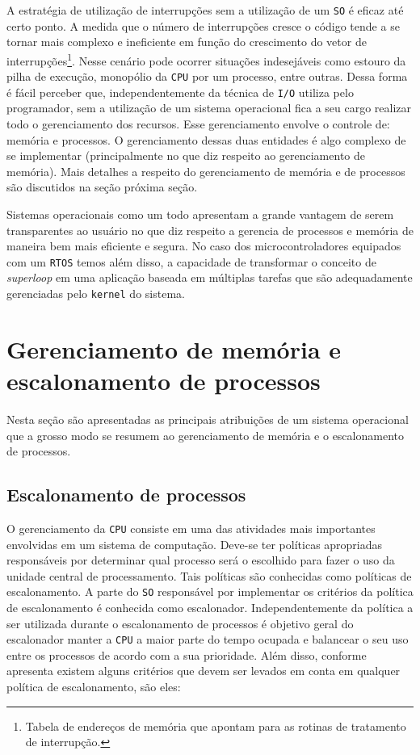A estratégia de utilização de interrupções sem a utilização de um \texttt{SO} é eficaz até certo ponto. A medida que o número de interrupções cresce o código tende a se tornar mais complexo e ineficiente em função do crescimento do vetor de interrupções\footnote{Tabela de endereços de memória que apontam para as rotinas de tratamento de interrupção.}. Nesse cenário pode ocorrer situações indesejáveis como estouro da pilha de execução, monopólio da \texttt{CPU} por um processo, entre outras.  Dessa forma é fácil perceber que, independentemente da técnica de \texttt{I/O} utiliza pelo programador, sem a utilização de um sistema operacional fica a seu cargo realizar todo o gerenciamento dos recursos. Esse gerenciamento envolve o controle de: memória e processos. O gerenciamento dessas duas entidades é algo complexo de se implementar (principalmente no que diz respeito ao gerenciamento de memória). Mais detalhes a respeito do gerenciamento de memória e de processos são discutidos na seção próxima seção.

Sistemas operacionais como um todo apresentam a grande vantagem de serem transparentes ao usuário no que diz respeito a gerencia de processos e memória de maneira bem mais eficiente e segura. No caso dos microcontroladores equipados com um \texttt{RTOS} temos além disso, a capacidade de transformar o conceito de \textit{superloop} em uma aplicação baseada em múltiplas tarefas que são adequadamente gerenciadas pelo \texttt{kernel} do sistema. 

\section{Gerenciamento de memória e escalonamento de processos} 

Nesta seção são apresentadas as principais atribuições de um sistema operacional que a grosso modo se resumem ao gerenciamento de memória e o escalonamento de processos.

\subsection{Escalonamento de processos} 

O gerenciamento da \texttt{CPU} consiste em uma das atividades mais importantes envolvidas em um sistema de computação. Deve-se ter políticas apropriadas responsáveis por determinar qual processo será o escolhido para fazer o uso da unidade central de processamento. Tais políticas são conhecidas como políticas de escalonamento. A parte do \texttt{SO} responsável por implementar os critérios da política de escalonamento é conhecida como escalonador. Independentemente da política a ser utilizada durante o escalonamento de processos é objetivo geral do escalonador manter a \texttt{CPU} a maior parte do tempo ocupada e balancear o seu uso entre os processos de acordo com a sua prioridade. Além disso, conforme apresenta \cite{machadomaia} existem alguns critérios que devem ser levados em conta em qualquer política de escalonamento, são eles:

